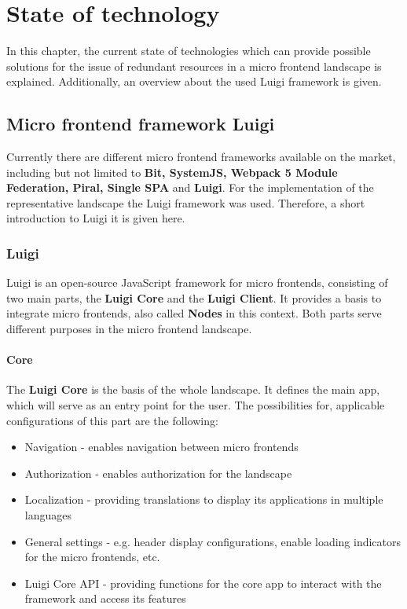 \chapter{State of technology} %
\label{Chapter2}


In this chapter, the current state of technologies which can provide possible solutions for the issue of redundant resources in a micro frontend landscape is explained. Additionally, an overview about the used Luigi framework is given.

\section{Micro frontend framework Luigi}
\label{mf_framework_luigi}

Currently there are different micro frontend frameworks available on the market, including but not limited to \textbf{Bit, SystemJS, Webpack 5 Module Federation, Piral, Single SPA} and \textbf{Luigi}.\cite{top10_mffs}
For the implementation of the representative landscape the Luigi framework was used. Therefore, a short introduction to Luigi it is given here.

\subsection{Luigi}

Luigi is an open-source JavaScript framework for micro frontends, consisting of two main parts, the \textbf{Luigi Core} and the \textbf{Luigi Client}. It provides a basis to integrate micro frontends, also called \textbf{Nodes} in this context. Both parts serve different purposes in the micro frontend landscape.\cite{luigi_doc_overview}

\subsubsection{Core}

The \textbf{Luigi Core} is the basis of the whole landscape. It defines the main app, which will serve as an entry point for the user. The possibilities for, applicable configurations of this part are the following:

\begin{itemize}[noitemsep]
	\item Navigation - enables navigation between micro frontends
	\item Authorization - enables authorization for the landscape
	\item Localization - providing translations to display its applications in multiple languages
	\item General settings - e.g. header display configurations, enable loading indicators for the micro frontends, etc.
	\item Luigi Core API - providing functions for the core app to interact with the framework and access its features
\end{itemize} 

